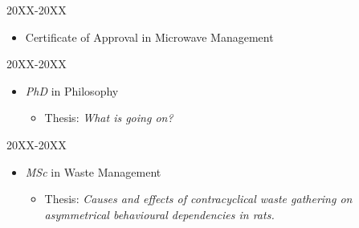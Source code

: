 





\begin{timeline}
\item \subtitle{Practical U}
	\hfill 20XX-20XX
	\begin{itemize}[leftmargin=7mm, labelsep=2mm, itemsep=2mm, parsep=0mm]
		\item[\lline{olofblue}] Certificate of Approval in Microwave Management
	\end{itemize}

\item \subtitle{Big U}
	\hfill 20XX-20XX
	\begin{itemize}[leftmargin=7mm, labelsep=2mm, itemsep=2mm, parsep=0mm]
		\item[\lline{olofblue}] {\textit{PhD}} in Philosophy
		\begin{itemize}
			\item[] Thesis: \textit{What is going on?}
		\end{itemize}
	\end{itemize}

\item \subtitle{City U}
	\hfill 20XX-20XX
	\begin{itemize}[leftmargin=7mm, labelsep=2mm, itemsep=2mm, parsep=0mm]
		\item[\lline{olofblue}] {\textit{MSc}} in Waste Management
		\begin{itemize}
			\item[] Thesis: \textit{Causes and effects of contracyclical waste gathering on \\asymmetrical behavioural dependencies in rats.}
		\end{itemize}
	\end{itemize}
\end{timeline}
